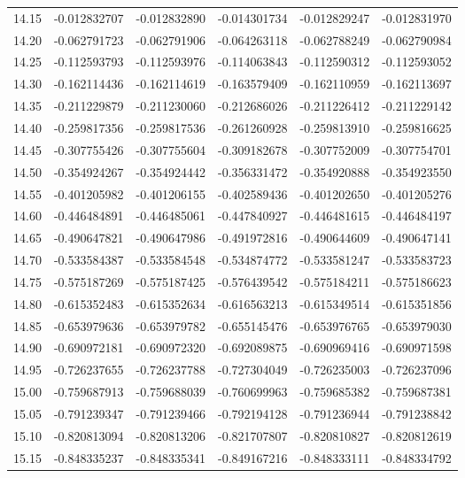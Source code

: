 \documentclass[11pt,a4paper]{article}
\begin{document}
\begin{longtable}{rrrrrr}
14.15 & -0.012832707 & -0.012832890 & -0.014301734 & -0.012829247 & -0.012831970 \\
14.20 & -0.062791723 & -0.062791906 & -0.064263118 & -0.062788249 & -0.062790984 \\
14.25 & -0.112593793 & -0.112593976 & -0.114063843 & -0.112590312 & -0.112593052 \\
14.30 & -0.162114436 & -0.162114619 & -0.163579409 & -0.162110959 & -0.162113697 \\
14.35 & -0.211229879 & -0.211230060 & -0.212686026 & -0.211226412 & -0.211229142 \\
14.40 & -0.259817356 & -0.259817536 & -0.261260928 & -0.259813910 & -0.259816625 \\
14.45 & -0.307755426 & -0.307755604 & -0.309182678 & -0.307752009 & -0.307754701 \\
14.50 & -0.354924267 & -0.354924442 & -0.356331472 & -0.354920888 & -0.354923550 \\
14.55 & -0.401205982 & -0.401206155 & -0.402589436 & -0.401202650 & -0.401205276 \\
14.60 & -0.446484891 & -0.446485061 & -0.447840927 & -0.446481615 & -0.446484197 \\
14.65 & -0.490647821 & -0.490647986 & -0.491972816 & -0.490644609 & -0.490647141 \\
14.70 & -0.533584387 & -0.533584548 & -0.534874772 & -0.533581247 & -0.533583723 \\
14.75 & -0.575187269 & -0.575187425 & -0.576439542 & -0.575184211 & -0.575186623 \\
14.80 & -0.615352483 & -0.615352634 & -0.616563213 & -0.615349514 & -0.615351856 \\
14.85 & -0.653979636 & -0.653979782 & -0.655145476 & -0.653976765 & -0.653979030 \\
14.90 & -0.690972181 & -0.690972320 & -0.692089875 & -0.690969416 & -0.690971598 \\
14.95 & -0.726237655 & -0.726237788 & -0.727304049 & -0.726235003 & -0.726237096 \\
15.00 & -0.759687913 & -0.759688039 & -0.760699963 & -0.759685382 & -0.759687381 \\
15.05 & -0.791239347 & -0.791239466 & -0.792194128 & -0.791236944 & -0.791238842 \\
15.10 & -0.820813094 & -0.820813206 & -0.821707807 & -0.820810827 & -0.820812619 \\
15.15 & -0.848335237 & -0.848335341 & -0.849167216 & -0.848333111 & -0.848334792 \\

\end{longtable}
\end{document}
